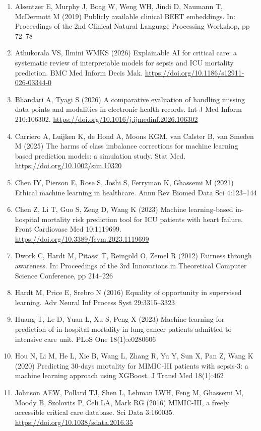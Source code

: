\documentclass[12pt,a4paper]{report}
\begin{document}
\begingroup\sloppy
\begin{enumerate}
  \item Alsentzer E, Murphy J, Boag W, Weng WH, Jindi D, Naumann T, McDermott M (2019) Publicly available clinical BERT embeddings. In: Proceedings of the 2nd Clinical Natural Language Processing Workshop, pp 72--78
  \item Athukorala VS, Ilmini WMKS (2026) Explainable AI for critical care: a systematic review of interpretable models for sepsis and ICU mortality prediction. BMC Med Inform Decis Mak. \url{https://doi.org/10.1186/s12911-026-03344-0}
  \item Bhandari A, Tyagi S (2026) A comparative evaluation of handling missing data points and modalities in electronic health records. Int J Med Inform 210:106302. \url{https://doi.org/10.1016/j.ijmedinf.2026.106302}
  \item Carriero A, Luijken K, de Hond A, Moons KGM, van Calster B, van Smeden M (2025) The harms of class imbalance corrections for machine learning based prediction models: a simulation study. Stat Med. \url{https://doi.org/10.1002/sim.10320}
  \item Chen IY, Pierson E, Rose S, Joshi S, Ferryman K, Ghassemi M (2021) Ethical machine learning in healthcare. Annu Rev Biomed Data Sci 4:123--144
  \item Chen Z, Li T, Guo S, Zeng D, Wang K (2023) Machine learning-based in-hospital mortality risk prediction tool for ICU patients with heart failure. Front Cardiovasc Med 10:1119699. \url{https://doi.org/10.3389/fcvm.2023.1119699}
  \item Dwork C, Hardt M, Pitassi T, Reingold O, Zemel R (2012) Fairness through awareness. In: Proceedings of the 3rd Innovations in Theoretical Computer Science Conference, pp 214--226
  \item Hardt M, Price E, Srebro N (2016) Equality of opportunity in supervised learning. Adv Neural Inf Process Syst 29:3315--3323
  \item Huang T, Le D, Yuan L, Xu S, Peng X (2023) Machine learning for prediction of in-hospital mortality in lung cancer patients admitted to intensive care unit. PLoS One 18(1):e0280606
  \item Hou N, Li M, He L, Xie B, Wang L, Zhang R, Yu Y, Sun X, Pan Z, Wang K (2020) Predicting 30-days mortality for MIMIC-III patients with sepsis-3: a machine learning approach using XGBoost. J Transl Med 18(1):462
  \item Johnson AEW, Pollard TJ, Shen L, Lehman LWH, Feng M, Ghassemi M, Moody B, Szolovits P, Celi LA, Mark RG (2016) MIMIC-III, a freely accessible critical care database. Sci Data 3:160035. \url{https://doi.org/10.1038/sdata.2016.35}

\end{enumerate}
\end{document}

